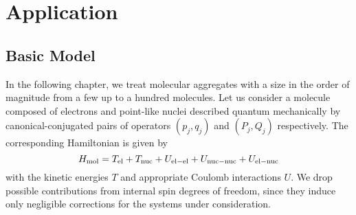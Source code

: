 \chapter{Application}
\label{chap:app}
%



\section{Basic Model}
\label{sec:app.model}
%

%

In the following chapter, we treat molecular aggregates with a size in the order of magnitude from a few up to a hundred molecules.
Let us consider a molecule composed of electrons and point-like nuclei described quantum mechanically by canonical-conjugated pairs of operators $(p_j, q_j)$ and $(P_j, Q_j)$ respectively.
The corresponding Hamiltonian is given by
\begin{equation}
  H_\mathrm{mol} = T_\mathrm{el} + T_\mathrm{nuc} + U_\mathrm{el-el} + U_\mathrm{nuc-nuc} + U_\mathrm{el-nuc}
  \label{eq:app.mol_hamil}
\end{equation}
with the kinetic energies $T$ and appropriate Coulomb interactions $U$.
We drop possible contributions from internal spin degrees of freedom, since they induce only negligible corrections for the systems under consideration.

